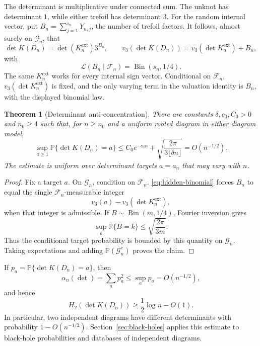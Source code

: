 \documentclass[9pt,twoside]{pnas-new}
\newtheorem{theorem}{Theorem}
\theoremstyle{definition}
\theoremstyle{remark}
\renewcommand{\Pr}{\mathbb{P}}
\begin{document}
The determinant is multiplicative under connected sum.  The unknot has determinant $1$, while either trefoil has determinant $3$.  For the random internal vector, put $B_n=\sum_{j=1}^{s_n}Y_{n,j}$, the number of trefoil factors.  It follows, almost surely on $\mathcal G_n$, that
\begin{equation}
 \det K(D_n)=\det(K_n^{\mathrm{ext}})3^{B_n},
 \qquad
 v_3\!\left(\det K(D_n)\right)=v_3(\det K_n^{\mathrm{ext}})+B_n,
 \label{eq:hidden-binomial}
\end{equation}
with
\[
 \mathcal L(B_n\mid\mathcal F_n)=\operatorname{Bin}(s_n,1/4).
\]
The same $K_n^{\mathrm{ext}}$ works for every internal sign vector. Conditional on $\mathcal F_n$, $v_3(\det K_n^{\mathrm{ext}})$ is fixed, and the only varying term in the valuation identity is $B_n$, with the displayed binomial law.

\begin{theorem}[Determinant anti-concentration]
\label{thm:det-anti}
There are constants $\delta,c_0,C_0>0$ and $n_0\ge4$ such that, for $n\ge n_0$ and a uniform rooted diagram in either diagram model,
\[
 \sup_{a\ge1}\Pr\{\det K(D_n)=a\}
 \le
 C_0e^{-c_0n}
 +\sqrt{\frac{2\pi}{3\lfloor\delta n\rfloor}}
 =O(n^{-1/2}).
\]
The estimate is uniform over determinant targets $a=a_n$ that may vary with $n$.
\end{theorem}

\begin{proof}
Fix a target $a$.  On $\mathcal G_n$, condition on $\mathcal F_n$.  \eqref{eq:hidden-binomial} forces $B_n$ to equal the single $\mathcal F_n$-measurable integer
\[
 v_3(a)-v_3(\det K_n^{\mathrm{ext}}),
\]
when that integer is admissible.  If $B\sim\operatorname{Bin}(m,1/4)$, Fourier inversion gives
\[
 \sup_k\Pr\{B=k\}\le\sqrt{\frac{2\pi}{3m}}.
\]
Thus the conditional target probability is bounded by this quantity on $\mathcal G_n$.  Taking expectations and adding $\Pr(\mathcal G_n^c)$ proves the claim.
\end{proof}

If $p_a=\Pr\{\det K(D_n)=a\}$, then
\[
 \alpha_n(\det)=\sum_a p_a^2
 \le \sup_a p_a
 =O(n^{-1/2}),
\]
and hence
\[
 H_2(\det K(D_n))\ge\frac12\log n-O(1).
\]
In particular, two independent diagrams have different determinants with probability $1-O(n^{-1/2})$. Section~\ref{sec:black-holes} applies this estimate to black-hole probabilities and databases of independent diagrams.
\end{document}
